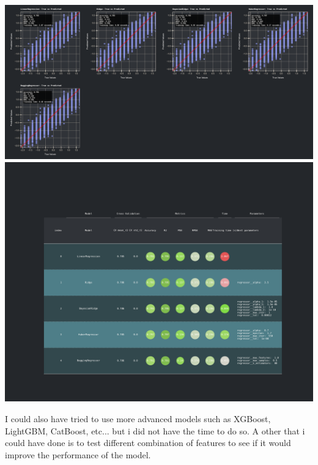 \documentclass{assignment}
\begin{document}
\begin{center}
    \includegraphics[width=6.5in]{../report/assets/remove_features_best_models_result.pdf}    
    \includegraphics[width=6.5in]{../report/assets/remove_features_best_models_result_table.pdf}
\end{center}

I could also have tried to use more advanced models such as XGBoost, LightGBM, CatBoost, etc... but i did not have the time to do so.
A other that i could have done is to test different combination of features to see if it would improve the performance of the model.

\newpage
\end{document}

